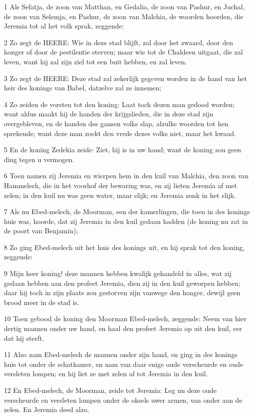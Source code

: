 \par 1 Als Sefatja, de zoon van Matthan, en Gedalia, de zoon van Pashur, en Juchal, de zoon van Selemja, en Pashur, de zoon van Malchia, de woorden hoorden, die Jeremia tot al het volk sprak, zeggende:
\par 2 Zo zegt de HEERE: Wie in deze stad blijft, zal door het zwaard, door den honger of door de pestilentie sterven; maar wie tot de Chaldeen uitgaat, die zal leven, want hij zal zijn ziel tot een buit hebben, en zal leven.
\par 3 Zo zegt de HEERE: Deze stad zal zekerlijk gegeven worden in de hand van het heir des konings van Babel, datzelve zal ze innemen;
\par 4 Zo zeiden de vorsten tot den koning: Laat toch dezen man gedood worden; want aldus maakt hij de handen der krijgslieden, die in deze stad zijn overgebleven, en de handen des gansen volks slap, alzulke woorden tot hen sprekende; want deze man zoekt den vrede dezes volks niet, maar het kwaad.
\par 5 En de koning Zedekia zeide: Ziet, hij is in uw hand; want de koning zou geen ding tegen u vermogen.
\par 6 Toen namen zij Jeremia en wierpen hem in den kuil van Malchia, den zoon van Hammelech, die in het voorhof der bewaring was, en zij lieten Jeremia af met zelen; in den kuil nu was geen water, maar slijk; en Jeremia zonk in het slijk.
\par 7 Als nu Ebed-melech, de Moorman, een der kamerlingen, die toen in des konings huis was, hoorde, dat zij Jeremia in den kuil gedaan hadden (de koning nu zat in de poort van Benjamin);
\par 8 Zo ging Ebed-melech uit het huis des konings uit, en hij sprak tot den koning, zeggende:
\par 9 Mijn heer koning! deze mannen hebben kwalijk gehandeld in alles, wat zij gedaan hebben aan den profeet Jeremia, dien zij in den kuil geworpen hebben; daar hij toch in zijn plaats zou gestorven zijn vanwege den honger, dewijl geen brood meer in de stad is.
\par 10 Toen gebood de koning den Moorman Ebed-melech, zeggende: Neem van hier dertig mannen onder uw hand, en haal den profeet Jeremia op uit den kuil, eer dat hij sterft.
\par 11 Alzo nam Ebed-melech de mannen onder zijn hand, en ging in des konings huis tot onder de schatkamer, en nam van daar enige oude verscheurde en oude versleten lompen; en hij liet ze met zelen af tot Jeremia in den kuil.
\par 12 En Ebed-melech, de Moorman, zeide tot Jeremia: Leg nu deze oude verscheurde en versleten lompen onder de oksels uwer armen, van onder aan de zelen. En Jeremia deed alzo.
